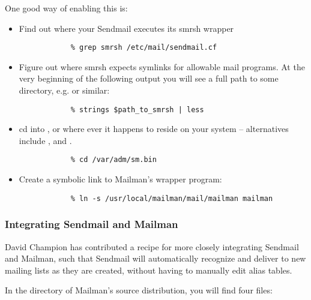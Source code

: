 \documentclass{howto}
\begin{document}
One good way of enabling this is:

\begin{itemize}
    \item Find out where your Sendmail executes its smrsh wrapper

          \begin{verbatim}
            % grep smrsh /etc/mail/sendmail.cf
          \end{verbatim}

    \item Figure out where smrsh expects symlinks for allowable mail
          programs.  At the very beginning of the following output you will
          see a full path to some directory, e.g.  or
          similar:

          \begin{verbatim}
            % strings $path_to_smrsh | less
          \end{verbatim}

    \item cd into , or where ever it happens to reside
          on your system -- alternatives include ,
           and .

          \begin{verbatim}
            % cd /var/adm/sm.bin
          \end{verbatim}

    \item Create a symbolic link to Mailman's wrapper program:

          \begin{verbatim}
            % ln -s /usr/local/mailman/mail/mailman mailman
          \end{verbatim}
\end{itemize}

\subsubsection{Integrating Sendmail and Mailman}

David Champion has contributed a recipe for more closely integrating Sendmail
and Mailman, such that Sendmail will automatically recognize and deliver to
new mailing lists as they are created, without having to manually edit alias
tables.

In the  directory of Mailman's source distribution, you will
find four files:
\end{document}
